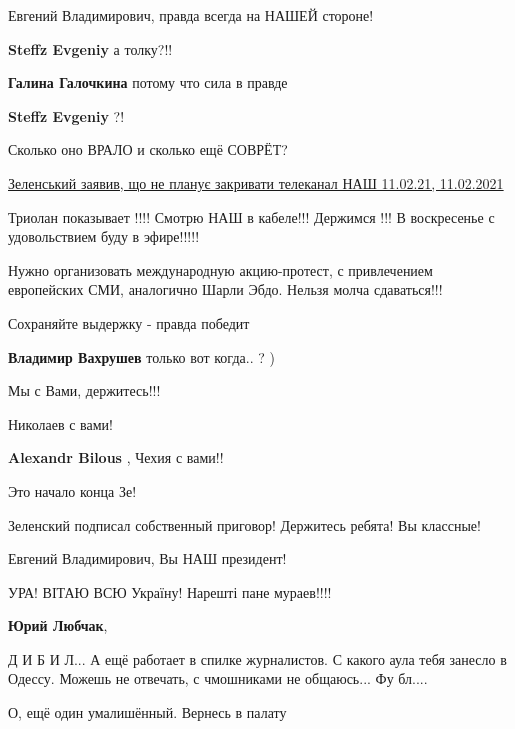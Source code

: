 \begin{itemize}
Евгений Владимирович, правда всегда на НАШЕЙ стороне!

\begin{itemize} %
\textbf{Steffz Evgeniy} а толку?!!

\textbf{Галина Галочкина} потому что сила в правде

\textbf{Steffz Evgeniy} ?!
\end{itemize} %

Сколько оно ВРАЛО и сколько ещё СОВРЁТ?

\href{https://youtu.be/8iiNtNuplj8}{%
Зеленський заявив, що не планує закривати телеканал НАШ 11.02.21, %
11.02.2021%
}


Триолан показывает !!!! Смотрю НАШ в кабеле!!! Держимся !!! В воскресенье с удовольствием буду в эфире!!!!!


Нужно организовать международную акцию-протест, с привлечением европейских СМИ,
аналогично Шарли Эбдо. Нельзя молча сдаваться!!!


Сохраняйте выдержку - правда победит

\textbf{Владимир Вахрушев} только вот когда.. ? )

Мы с Вами, держитесь!!!

Николаев с вами!

\textbf{Alexandr Bilous} , Чехия с вами!!

Это начало конца Зе!

Зеленский подписал собственный приговор! Держитесь ребята! Вы классные!

Евгений Владимирович, Вы НАШ президент!

УРА! ВІТАЮ ВСЮ Україну! Нарешті пане мураев!!!!

\begin{itemize} %
\textbf{Юрий Любчак}, 

Д И Б И Л... А ещё работает в спилке журналистов. С какого аула тебя занесло в
Одессу. Можешь не отвечать, с чмошниками не общаюсь... Фу бл....

О, ещё один умалишённый. Вернесь в палату
\end{itemize} %


\end{itemize}
